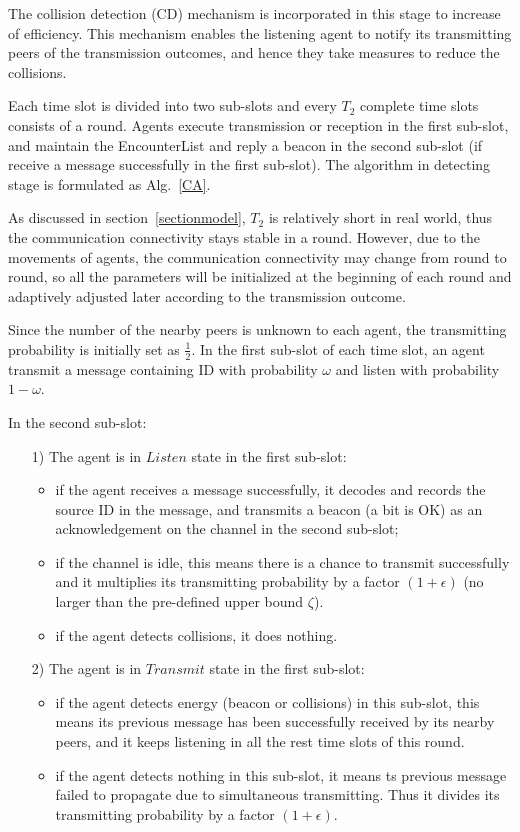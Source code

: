 The collision detection (CD) mechanism is incorporated in this stage 
to increase of efficiency. This mechanism enables the listening agent 
to notify its transmitting peers of the transmission outcomes, 
and hence they take measures to reduce the collisions.

Each time slot is divided into two sub-slots and every 
$T_2$ complete time slots consists of a round.
Agents execute transmission or reception in the first sub-slot, 
and maintain the EncounterList and reply a beacon in the second sub-slot (if receive a message 
successfully in the first sub-slot). The algorithm in detecting stage is formulated as Alg.~\ref{CA}.

As discussed in section~\ref{sectionmodel}, $T_2$ is relatively short in 
real world, thus the communication connectivity stays stable in a round. 
However, due to the movements of agents, the communication connectivity
may change from round to round, so all the parameters will be 
initialized at the beginning of each round and adaptively adjusted later 
according to the transmission outcome.

Since the number of the nearby peers is unknown to each agent, 
the transmitting probability is initially set as $\frac{1}{2}$.
In the first sub-slot of each time slot, an agent transmit a message containing ID 
with probability $\omega$ and listen with probability $1 - \omega$. 

In the second sub-slot: 
\begin{itemize}
    \item[1)] The agent is in $Listen$ state in the first sub-slot:
    \begin{itemize}
    \item if the agent receives a message successfully, it 
    decodes and records the source ID in the message, and
    transmits a beacon (a bit is OK) as an acknowledgement 
    on the channel in the second sub-slot; 
    \item if the channel is idle, this means there is a chance to 
    transmit successfully and it multiplies its transmitting 
    probability by a factor $(1+\epsilon)$ (no larger than the pre-defined
    upper bound $\zeta$).
    \item if the agent detects collisions, it does nothing.
    \end{itemize}
    \item[2)] The agent is in $Transmit$ state in the first sub-slot:
    \begin{itemize}
    \item if the agent detects energy (beacon or collisions) in this sub-slot,
    this means its previous message has been successfully received by its nearby
    peers, and it keeps listening in all the rest time slots of this round.
    \item if the agent detects nothing in this sub-slot, it means ts previous message
    failed to propagate due to simultaneous transmitting. Thus it divides its transmitting 
    probability by a factor $(1+\epsilon)$. 
    \end{itemize}
\end{itemize}

